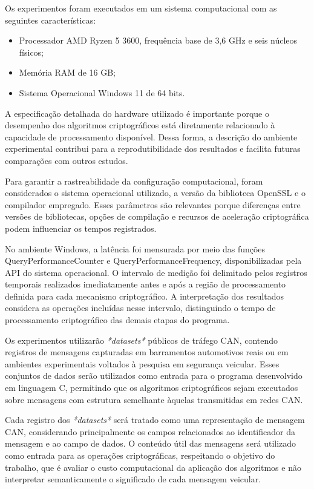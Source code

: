 Os experimentos foram executados em um sistema computacional com as seguintes características:


\begin{itemize}

\item Processador AMD Ryzen 5 3600, frequência base de 3,6 GHz e seis núcleos físicos;

\item Memória RAM de 16 GB;

\item Sistema Operacional Windows 11 de 64 bits.

\end{itemize}

A especificação detalhada do hardware utilizado é importante porque o desempenho dos algoritmos criptográficos está diretamente relacionado à capacidade de processamento disponível. Dessa forma, a descrição do ambiente experimental contribui para a reprodutibilidade dos resultados e facilita futuras comparações com outros estudos.

Para garantir a rastreabilidade da configuração computacional, foram considerados o sistema operacional utilizado, a versão da biblioteca OpenSSL e o compilador empregado. Esses parâmetros são relevantes porque diferenças entre versões de bibliotecas, opções de compilação e recursos de aceleração criptográfica podem influenciar os tempos registrados.

No ambiente Windows, a latência foi mensurada por meio das funções QueryPerformanceCounter e QueryPerformanceFrequency, disponibilizadas pela API do sistema operacional. O intervalo de medição foi delimitado pelos registros temporais realizados imediatamente antes e após a região de processamento definida para cada mecanismo criptográfico. A interpretação dos resultados considera as operações incluídas nesse intervalo, distinguindo o tempo de processamento criptográfico das demais etapas do programa.

Os experimentos utilizarão \textit{*datasets*} públicos de tráfego CAN, contendo registros de mensagens capturadas em barramentos automotivos reais ou em ambientes experimentais voltados à pesquisa em segurança veicular. Esses conjuntos de dados serão utilizados como entrada para o programa desenvolvido em linguagem C, permitindo que os algoritmos criptográficos sejam executados sobre mensagens com estrutura semelhante àquelas transmitidas em redes CAN.

Cada registro dos \textit{*datasets*} será tratado como uma representação de mensagem CAN, considerando principalmente os campos relacionados ao identificador da mensagem e ao campo de dados. O conteúdo útil das mensagens será utilizado como entrada para as operações criptográficas, respeitando o objetivo do trabalho, que é avaliar o custo computacional da aplicação dos algoritmos e não interpretar semanticamente o significado de cada mensagem veicular.

